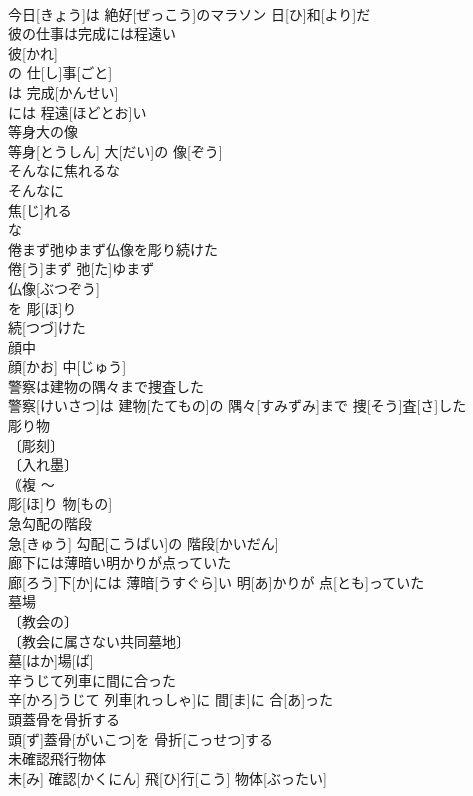 \documentclass[8pt]{extreport}
\begin{document}
\begin{CJK}{UTF8}{min}
\\	今日[きょう]は 絶好[ぜっこう]のマラソン 日[ひ]和[より]だ
\\	彼の仕事は完成には程遠い	
\\	彼[かれ]
\\	の 仕[し]事[ごと]
\\	は 完成[かんせい]
\\	には 程遠[ほどとお]い 
\\	等身大の像	
\\	等身[とうしん] 大[だい]の 像[ぞう]
\\	そんなに焦れるな	
\\	そんなに 
\\	焦[じ]れる 
\\	な
\\	倦まず弛ゆまず仏像を彫り続けた	
\\	倦[う]まず 弛[た]ゆまず 
\\	仏像[ぶつぞう]
\\	を 彫[ほ]り 
\\	続[つづ]けた 
\\	顔中	
\\	顔[かお] 中[じゅう]
\\	警察は建物の隅々まで捜査した	
\\	警察[けいさつ]は 建物[たてもの]の 隅々[すみずみ]まで 捜[そう]査[さ]した
\\	彫り物	
\\	〔彫刻〕
\\	〔入れ墨〕
\\	｟複 〜
\\	彫[ほ]り 物[もの]
\\	急勾配の階段	
\\	急[きゅう] 勾配[こうばい]の 階段[かいだん]
\\	廊下には薄暗い明かりが点っていた	
\\	廊[ろう]下[か]には 薄暗[うすぐら]い 明[あ]かりが 点[とも]っていた
\\	墓場	
\\	〔教会の〕
\\	〔教会に属さない共同墓地〕
\\	墓[はか]場[ば]
\\	辛うじて列車に間に合った	
\\	辛[かろ]うじて 列車[れっしゃ]に 間[ま]に 合[あ]った
\\	頭蓋骨を骨折する	
\\	頭[ず]蓋骨[がいこつ]を 骨折[こっせつ]する
\\	未確認飛行物体	
\\	未[み] 確認[かくにん] 飛[ひ]行[こう] 物体[ぶったい]

\end{CJK}
\end{document}
